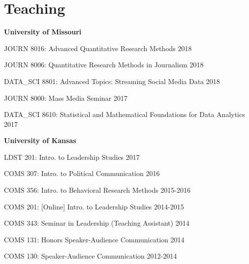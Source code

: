 
\section{Teaching}

  \textbf{University of Missouri}
    \begin{innerlist}
      \item JOURN 8016: Advanced Quantitative Research Methods                          \hfill 2018
      \item JOURN 8006: Quantitative Research Methods in Journalism                     \hfill 2018
      \item DATA\_SCI 8801: Advanced Topics: Streaming Social Media Data                \hfill 2018
      \item JOURN 8000: Mass Media Seminar                                              \hfill 2017
      \item DATA\_SCI 8610: Statistical and Mathematical Foundations for Data Analytics \hfill 2017
    \end{innerlist}\vspace{1em}

  \textbf{University of Kansas}
    \begin{innerlist}
      \item LDST 201: Intro. to Leadership Studies                                      \hfill 2017
      \item COMS 307: Intro. to Political Communication                                 \hfill 2016
      \item COMS 356: Intro. to Behavioral Research Methods                             \hfill 2015-2016
      \item COMS 201: {[}Online{]} Intro. to Leadership Studies                         \hfill 2014-2015
      \item COMS 343: Seminar in Leadership (Teaching Assistant)                        \hfill 2014
      \item COMS 131: Honors Speaker-Audience Communication                             \hfill 2014
      \item COMS 130: Speaker-Audience Communication                                    \hfill 2012-2014
    \end{innerlist}\vspace{-.1in}
